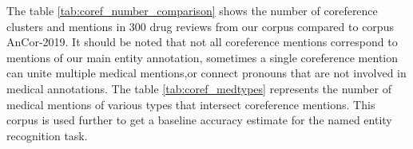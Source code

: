 \documentclass[a4paper,fleqn,longmktitle]{cas-dc}
\begin{document}
The table \ref{tab:coref_number_comparison} shows the number of coreference clusters and mentions in 300 drug reviews from our corpus compared to corpus AnCor-2019. It should be noted that not all coreference mentions correspond to mentions of our main entity annotation, sometimes a single coreference mention can unite multiple medical mentions,or connect pronouns that are not involved in medical annotations.  The table \ref{tab:coref_medtypes} represents the number of medical mentions of various types that intersect coreference mentions. This corpus is used further to get a baseline accuracy estimate for the named entity recognition task.
\end{document}
